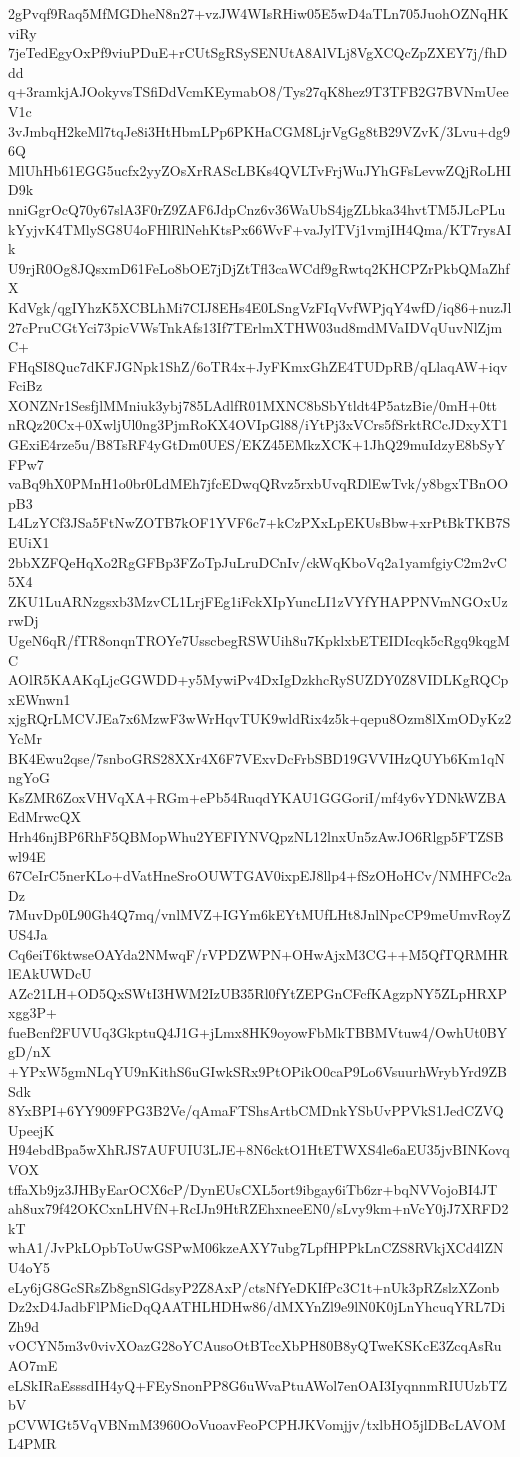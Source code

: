 2gPvqf9Raq5MfMGDheN8n27+vzJW4WIsRHiw05E5wD4aTLn705JuohOZNqHKviRy
7jeTedEgyOxPf9viuPDuE+rCUtSgRSySENUtA8AlVLj8VgXCQcZpZXEY7j/fhDdd
q+3ramkjAJOokyvsTSfiDdVcmKEymabO8/Tys27qK8hez9T3TFB2G7BVNmUeeV1c
3vJmbqH2keMl7tqJe8i3HtHbmLPp6PKHaCGM8LjrVgGg8tB29VZvK/3Lvu+dg96Q
MlUhHb61EGG5ucfx2yyZOsXrRAScLBKs4QVLTvFrjWuJYhGFsLevwZQjRoLHID9k
nniGgrOcQ70y67slA3F0rZ9ZAF6JdpCnz6v36WaUbS4jgZLbka34hvtTM5JLcPLu
kYyjvK4TMlySG8U4oFHlRlNehKtsPx66WvF+vaJylTVj1vmjIH4Qma/KT7rysAIk
U9rjR0Og8JQsxmD61FeLo8bOE7jDjZtTfl3caWCdf9gRwtq2KHCPZrPkbQMaZhfX
KdVgk/qgIYhzK5XCBLhMi7CIJ8EHs4E0LSngVzFIqVvfWPjqY4wfD/iq86+nuzJl
27cPruCGtYci73picVWsTnkAfs13If7TErlmXTHW03ud8mdMVaIDVqUuvNlZjmC+
FHqSI8Quc7dKFJGNpk1ShZ/6oTR4x+JyFKmxGhZE4TUDpRB/qLlaqAW+iqvFciBz
XONZNr1SesfjlMMniuk3ybj785LAdlfR01MXNC8bSbYtldt4P5atzBie/0mH+0tt
nRQz20Cx+0XwljUl0ng3PjmRoKX4OVIpGl88/iYtPj3xVCrs5fSrktRCcJDxyXT1
GExiE4rze5u/B8TsRF4yGtDm0UES/EKZ45EMkzXCK+1JhQ29muIdzyE8bSyYFPw7
vaBq9hX0PMnH1o0br0LdMEh7jfcEDwqQRvz5rxbUvqRDlEwTvk/y8bgxTBnOOpB3
L4LzYCf3JSa5FtNwZOTB7kOF1YVF6c7+kCzPXxLpEKUsBbw+xrPtBkTKB7SEUiX1
2bbXZFQeHqXo2RgGFBp3FZoTpJuLruDCnIv/ckWqKboVq2a1yamfgiyC2m2vC5X4
ZKU1LuARNzgsxb3MzvCL1LrjFEg1iFckXIpYuncLI1zVYfYHAPPNVmNGOxUzrwDj
UgeN6qR/fTR8onqnTROYe7UsscbegRSWUih8u7KpklxbETEIDIcqk5cRgq9kqgMC
AOlR5KAAKqLjcGGWDD+y5MywiPv4DxIgDzkhcRySUZDY0Z8VIDLKgRQCpxEWnwn1
xjgRQrLMCVJEa7x6MzwF3wWrHqvTUK9wldRix4z5k+qepu8Ozm8lXmODyKz2YcMr
BK4Ewu2qse/7snboGRS28XXr4X6F7VExvDcFrbSBD19GVVIHzQUYb6Km1qNngYoG
KsZMR6ZoxVHVqXA+RGm+ePb54RuqdYKAU1GGGoriI/mf4y6vYDNkWZBAEdMrwcQX
Hrh46njBP6RhF5QBMopWhu2YEFIYNVQpzNL12lnxUn5zAwJO6Rlgp5FTZSBwl94E
67CeIrC5nerKLo+dVatHneSroOUWTGAV0ixpEJ8llp4+fSzOHoHCv/NMHFCc2aDz
7MuvDp0L90Gh4Q7mq/vnlMVZ+IGYm6kEYtMUfLHt8JnlNpcCP9meUmvRoyZUS4Ja
Cq6eiT6ktwseOAYda2NMwqF/rVPDZWPN+OHwAjxM3CG++M5QfTQRMHRlEAkUWDcU
AZc21LH+OD5QxSWtI3HWM2IzUB35Rl0fYtZEPGnCFcfKAgzpNY5ZLpHRXPxgg3P+
fueBcnf2FUVUq3GkptuQ4J1G+jLmx8HK9oyowFbMkTBBMVtuw4/OwhUt0BYgD/nX
+YPxW5gmNLqYU9nKithS6uGIwkSRx9PtOPikO0caP9Lo6VsuurhWrybYrd9ZBSdk
8YxBPI+6YY909FPG3B2Ve/qAmaFTShsArtbCMDnkYSbUvPPVkS1JedCZVQUpeejK
H94ebdBpa5wXhRJS7AUFUIU3LJE+8N6cktO1HtETWXS4le6aEU35jvBINKovqVOX
tffaXb9jz3JHByEarOCX6cP/DynEUsCXL5ort9ibgay6iTb6zr+bqNVVojoBI4JT
ah8ux79f42OKCxnLHVfN+RcIJn9HtRZEhxneeEN0/sLvy9km+nVcY0jJ7XRFD2kT
whA1/JvPkLOpbToUwGSPwM06kzeAXY7ubg7LpfHPPkLnCZS8RVkjXCd4lZNU4oY5
eLy6jG8GcSRsZb8gnSlGdsyP2Z8AxP/ctsNfYeDKIfPc3C1t+nUk3pRZslzXZonb
Dz2xD4JadbFlPMicDqQAATHLHDHw86/dMXYnZl9e9lN0K0jLnYhcuqYRL7DiZh9d
vOCYN5m3v0vivXOazG28oYCAusoOtBTccXbPH80B8yQTweKSKcE3ZcqAsRuAO7mE
eLSkIRaEsssdIH4yQ+FEySnonPP8G6uWvaPtuAWol7enOAI3IyqnnmRIUUzbTZbV
pCVWIGt5VqVBNmM3960OoVuoavFeoPCPHJKVomjjv/txlbHO5jlDBcLAVOML4PMR
